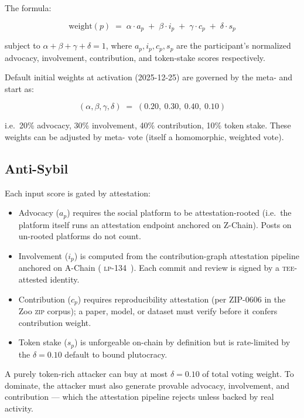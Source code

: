The formula:

\begin{equation}
\text{weight}(p) \;=\; \alpha \cdot a_p \;+\; \beta \cdot i_p \;+\; \gamma \cdot c_p \;+\; \delta \cdot s_p
\end{equation}

\noindent subject to $\alpha + \beta + \gamma + \delta = 1$, where
$a_p, i_p, c_p, s_p$ are the participant's normalized advocacy,
involvement, contribution, and token-stake scores respectively.

Default initial weights at activation (2025-12-25) are governed by the
meta-\DAO{} and start as:

\[
(\alpha, \beta, \gamma, \delta) \;=\; (0.20,\ 0.30,\ 0.40,\ 0.10)
\]

\noindent i.e.\ 20\% advocacy, 30\% involvement, 40\% contribution,
10\% token stake. These weights can be adjusted by meta-\DAO{} vote
(itself a homomorphic, weighted vote).

\subsection{Anti-Sybil}

Each input score is gated by attestation:

\begin{itemize}[nosep,leftmargin=1.2em]
\item Advocacy ($a_p$) requires the social platform to be
  attestation-rooted (i.e.\ the platform itself runs an attestation
  endpoint anchored on Z-Chain). Posts on un-rooted platforms do not
  count.
\item Involvement ($i_p$) is computed from the contribution-graph
  attestation pipeline anchored on \Lux{} A-Chain
  (\Lux{} \textsc{lp-134}~\cite{lp-134-topology}). Each commit and
  review is signed by a \textsc{tee}-attested identity.
\item Contribution ($c_p$) requires reproducibility attestation
  (per ZIP-0606 in the Zoo \textsc{zip} corpus); a paper, model, or
  dataset must verify before it confers contribution weight.
\item Token stake ($s_p$) is unforgeable on-chain by definition but
  is rate-limited by the $\delta = 0.10$ default to bound plutocracy.
\end{itemize}

A purely token-rich attacker can buy at most $\delta = 0.10$ of total
voting weight. To dominate, the attacker must also generate provable
advocacy, involvement, and contribution --- which the attestation
pipeline rejects unless backed by real activity.

